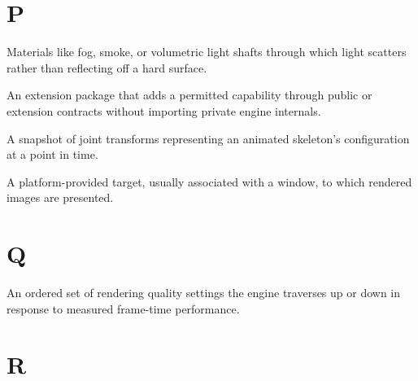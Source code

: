 \documentclass[
  11pt,
  letterpaper,
  DIV=11,
  numbers=noendperiod,
  twoside,
  open=right]{scrreprt}
\providecommand{\tightlist}{%
  \setlength{\itemsep}{0pt}\setlength{\parskip}{0pt}}
\begin{document}
\section*{P}\label{p}


\begin{description}
\tightlist
\item[\textbf{Participating media}]
Materials like fog, smoke, or volumetric light shafts through which
light scatters rather than reflecting off a hard surface.
\item[\textbf{Plugin}]
An extension package that adds a permitted capability through public or
extension contracts without importing private engine internals.
\item[\textbf{Pose}]
A snapshot of joint transforms representing an animated skeleton's
configuration at a point in time.
\item[\textbf{Presentation surface}]
A platform-provided target, usually associated with a window, to which
rendered images are presented.
\end{description}

\section*{Q}\label{q}


\begin{description}
\tightlist
\item[\textbf{Quality ladder}]
An ordered set of rendering quality settings the engine traverses up or
down in response to measured frame-time performance.
\end{description}

\section*{R}\label{r}

\end{document}
